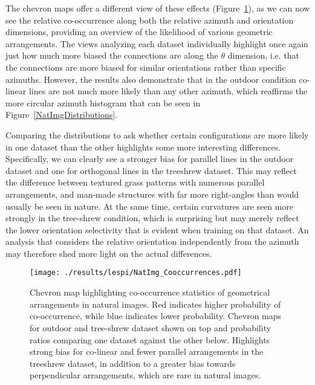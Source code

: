 The chevron maps offer a different view of these effects
(Figure~\ref{NatImgCooccurrences}), as we can now see the relative
co-occurrence along both the relative azimuth and orientation
dimensions, providing an overview of the likelihood of various
geometric arrangements. The views analyzing each dataset individually
highlight once again just how much more biased the connections are
along the $\theta$ dimension, i.e. that the connections are more
biased for similar orientations rather than specific
azimuths. However, the results also demonstrate that in the outdoor
condition co-linear lines are not much more likely than any other
azimuth, which reaffirms the more circular azimuth histogram that can
be seen in Figure~\ref{NatImgDistributions}.

Comparing the distributions to ask whether certain configurations are
more likely in one dataset than the other highlights some more
interesting differences.  Specifically, we can clearly see a stronger
bias for parallel lines in the outdoor dataset and one for orthogonal
lines in the treeshrew dataset. This may reflect the difference
between textured grass patterns with numerous parallel arrangements,
and man-made structures with far more right-angles than would usually
be seen in nature. At the same time, certain curvatures are seen more
strongly in the tree-shrew condition, which is surprising but may
merely reflect the lower orientation selectivity that is evident when
training on that dataset. An analysis that considers the relative
orientation independently from the azimuth may therefore shed more
light on the actual differences.

\begin{figure}
	\centering
        \texttt{[image: ./results/lespi/NatImg\_Cooccurrences.pdf]}
	\caption[Chevron map highlighting co-occurrence statistics of
      geometrical arrangements in natural images.]{Chevron map
      highlighting co-occurrence statistics of geometrical
      arrangements in natural images. Red indicates higher probability
      of co-occurrence, while blue indicates lower
      probability. Chevron maps for outdoor and tree-shrew dataset
      shown on top and probability ratios comparing one dataset
      against the other below. Highlights strong bias for co-linear
      and fewer parallel arrangements in the treeshrew dataset, in
      addition to a greater bias towards perpendicular arrangements,
      which are rare in natural images. }
	\label{NatImgCooccurrences}
\end{figure}

